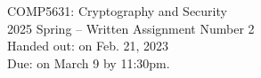 \documentclass[11pt,epsfig]{article}
\begin{document}
\newcommand{\lsp}[1]{\large\renewcommand{\baselinestretch}{#1}\normalsize}
\lsp{1}
{\bf 
\begin{center}
COMP5631: Cryptography and Security \\
2025 Spring -- Written Assignment Number 2 \\
Handed out: on Feb. 21, 2023 \\ 
Due: on March 9 by 11:30pm. \\ 

\end{center}
}

\thispagestyle{empty} \pagestyle{empty}


\end{document}
